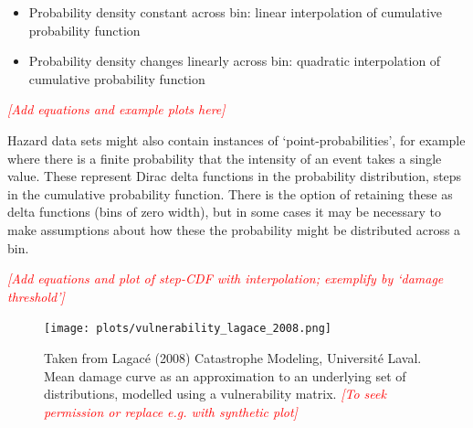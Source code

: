 \documentclass[a4paper,11pt]{extarticle} %
\begin{document}
\begin{itemize}
    \item Probability density constant across bin: linear interpolation of cumulative probability function
    \item Probability density changes linearly across bin: quadratic interpolation of cumulative probability function
\end{itemize}

{\textcolor{red}{\emph{[Add equations and example plots here]}}}

Hazard data sets might also contain instances of `point-probabilities', for example where there is a finite probability that the intensity of an event takes a single value. These represent Dirac delta functions in the probability distribution, steps in the cumulative probability function. There is the option of retaining these as delta functions (bins of zero width), but in some cases it may be necessary to make assumptions about how these the probability might be distributed across a bin.

{\textcolor{red}{\emph{[Add equations and plot of step-CDF with interpolation; exemplify by `damage threshold']}}}

\begin{figure}[ht]

    \begin{framed}

		\texttt{[image: plots/vulnerability\_lagace\_2008.png]}

    \end{framed}

    \footnotesize

    \renewcommand{\arraystretch}{1.01}

    \vspace{-3ex}


    \vspace{-0.5ex}

    \caption{\small Taken from Lagacé (2008) Catastrophe Modeling, Université Laval. Mean damage curve as an approximation to an underlying set of distributions, modelled using a vulnerability matrix. {\textcolor{red}{\emph{[To seek permission or replace e.g. with synthetic plot]}}}}
    \label{Fig:vulnerability_matrix}

\end{figure}
\end{document}
